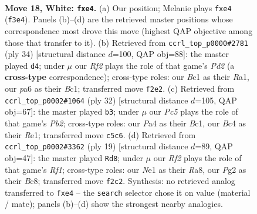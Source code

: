 \documentclass[11pt]{article}
\begin{document}
\clearpage

\begin{figure}[p]\centering
\begin{subfigure}{0.46\textwidth}\centering
\resizebox{\linewidth}{!}{%
\newchessgame
\chessboard[
  setfen={rn2bbr1/1p2k1np/p3p1p1/2P5/P1B1p3/2N2P2/1P3RPP/1RB1N1K1 w - - 0 18},
  showmover=false,
  pgfstyle=straightmove, color=movearrow, markmove={f3-e4}
]}
\caption{}
\end{subfigure}\hfill
\begin{subfigure}{0.46\textwidth}\centering
\resizebox{\linewidth}{!}{%
\newchessgame
\chessboard[
  setfen={2kr1b1r/1p1b2pp/p4p2/3nn3/1p6/2P4P/1PNP1RP1/RNB2BK1 w - - 0 18},
  showmover=false,
  pgfstyle=straightmove, color=movearrow, markmove={d2-d4}
]}
\caption{}
\end{subfigure}
\\[4pt]
\begin{subfigure}{0.46\textwidth}\centering
\resizebox{\linewidth}{!}{%
\newchessgame
\chessboard[
  setfen={r2kbr2/1pp1bp1p/nn6/pN4pB/P2P1p2/3N4/1PP3PP/R1B1R1K1 w - - 8 17},
  showmover=false,
  pgfstyle=straightmove, color=movearrow, markmove={b2-b3}
]}
\caption{}
\end{subfigure}\hfill
\begin{subfigure}{0.46\textwidth}\centering
\resizebox{\linewidth}{!}{%
\newchessgame
\chessboard[
  setfen={r1b2rk1/pp2pp1p/2n2npb/2p5/4PP2/2PBBN2/PP2K1PP/RN5R b - - 8 10},
  showmover=false,
  pgfstyle=straightmove, color=movearrow, markmove={f8-d8}
]}
\caption{}
\end{subfigure}
\caption{\textbf{Move 18, White: \texttt{fxe4}.} (a) Our position; Melanie plays \texttt{fxe4} (\texttt{f3e4}). Panels (b)--(d) are the retrieved master positions whose correspondence most drove this move (highest QAP objective among those that transfer to it). (b) Retrieved from \texttt{ccrl\_top\_p0000\#2781} (ply 34) [structural distance $d$=100, QAP obj=88]: the master played \texttt{d4}; under $\mu$ our \emph{Rf2} plays the role of that game's \emph{Pd2} (a \textbf{cross-type} correspondence); cross-type roles: our \emph{B}c1 as their \emph{R}a1, our \emph{p}a6 as their \emph{B}c1; transferred move \texttt{f2e2}. (c) Retrieved from \texttt{ccrl\_top\_p0002\#1064} (ply 32) [structural distance $d$=105, QAP obj=67]: the master played \texttt{b3}; under $\mu$ our \emph{Pc5} plays the role of that game's \emph{Pb2}; cross-type roles: our \emph{P}a4 as their \emph{B}c1, our \emph{B}c4 as their \emph{R}e1; transferred move \texttt{c5c6}. (d) Retrieved from \texttt{ccrl\_top\_p0002\#3362} (ply 19) [structural distance $d$=89, QAP obj=47]: the master played \texttt{Rd8}; under $\mu$ our \emph{Rf2} plays the role of that game's \emph{Rf1}; cross-type roles: our \emph{N}e1 as their \emph{R}a8, our \emph{P}g2 as their \emph{B}c8; transferred move \texttt{f2c2}. Synthesis: no retrieved analog transferred to \texttt{fxe4} -- the \texttt{search} selector chose it on value (material / mate); panels (b)--(d) show the strongest nearby analogies.}
\label{fig:thought-m34}
\end{figure}
\end{document}
